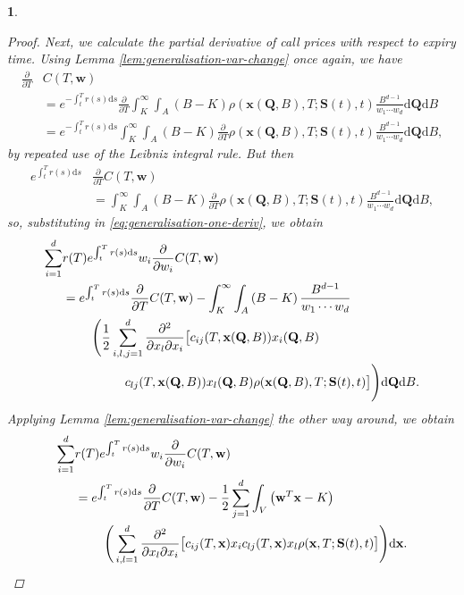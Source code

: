 \documentclass[english]{article}
\numberwithin{equation}{section}
\numberwithin{figure}{section}
\theoremstyle{bolddescit}
\newtheorem{theorem}{\protect\theoremname}[section]
\theoremstyle{definition}
\theoremstyle{definition}
\theoremstyle{plain}
\theoremstyle{plain}
\theoremstyle{bolddesc}
\theoremstyle{plain}
\theoremstyle{remark}
\providecommand{\theoremname}{Theorem}
\begin{document}
\begin{theorem}
\begin{proof}
    Next, we calculate the partial derivative of call prices with respect to expiry time. Using Lemma \ref{lem:generalisation-var-change} once again, we have
    \begin{align*}
      \frac{\partial}{\partial T} &C(T,\mathbf{w})\\
      &= e^{-\int_t^T r(s) \mathrm{d}s} \frac{\partial}{\partial T}\int_K^\infty \int_A \left(B - K\right) \rho(\mathbf{x}(\mathbf{Q},B),T;\mathbf{S}(t),t) \frac{B^{d-1}}{w_1 \cdots w_d} \mathrm{d}\mathbf{Q} \mathrm{d}B\\
      &= e^{-\int_t^T r(s) \mathrm{d}s} \int_K^\infty \int_A \left(B - K\right) \frac{\partial}{\partial T}\rho(\mathbf{x}(\mathbf{Q},B),T;\mathbf{S}(t),t) \frac{B^{d-1}}{w_1 \cdots w_d} \mathrm{d}\mathbf{Q} \mathrm{d}B,
    \end{align*}
    by repeated use of the Leibniz integral rule. But then
    \begin{align*}
      e^{\int_t^T r(s) \mathrm{d}s} &\frac{\partial}{\partial T} C(T,\mathbf{w})\\
      &= \int_K^\infty \int_A \left(B - K\right) \frac{\partial}{\partial T}\rho(\mathbf{x}(\mathbf{Q},B),T;\mathbf{S}(t),t) \frac{B^{d-1}}{w_1 \cdots w_d} \mathrm{d}\mathbf{Q} \mathrm{d}B,
    \end{align*}
    so, substituting in \eqref{eq:generalisation-one-deriv}, we obtain
    \begin{align*}
      \sum_{i=1}^{d} &r(T) e^{\int_t^T r(s) \mathrm{d}s} w_i \frac{\partial}{\partial w_i} C(T,\mathbf{w})\notag\\
      &= e^{\int_t^T r(s) \mathrm{d}s} \frac{\partial}{\partial T} C(T,\mathbf{w}) - \int_K^\infty \int_A \left(B - K\right) \frac{B^{d-1}}{w_1 \cdots w_d}\notag\\
        &\ \ \ \ \ \ \ \Bigg( \frac{1}{2} \sum_{i,l,j=1}^{d} \frac{\partial^2}{\partial x_l \partial x_i}\big[c_{ij}(T,\mathbf{x}(\mathbf{Q},B)) x_i(\mathbf{Q},B) \notag\\
        &\ \ \ \ \ \ \ \ \ \ \ \ \ \ \ c_{lj}(T,\mathbf{x}(\mathbf{Q},B)) x_l(\mathbf{Q},B) \rho(\mathbf{x}(\mathbf{Q},B),T;\mathbf{S}(t),t)\big] \Bigg) \mathrm{d}\mathbf{Q} \mathrm{d}B.
    \end{align*}
    Applying Lemma \ref{lem:generalisation-var-change} the other way around, we obtain
    \begin{align}
      \sum_{i=1}^{d} &r(T) e^{\int_t^T r(s) \mathrm{d}s} w_i \frac{\partial}{\partial w_i} C(T,\mathbf{w})\notag\\
      &= e^{\int_t^T r(s) \mathrm{d}s} \frac{\partial}{\partial T} C(T,\mathbf{w}) - \frac{1}{2} \sum_{j=1}^{d} \int_V \left(\mathbf{w}^T \mathbf{x} - K\right) \notag\\
        &\ \ \ \ \ \ \ \Bigg( \sum_{i,l=1}^{d} \frac{\partial^2}{\partial x_l \partial x_i}\big[c_{ij}(T,\mathbf{x}) x_i c_{lj}(T,\mathbf{x}) x_l \rho(\mathbf{x},T;\mathbf{S}(t),t)\big] \Bigg) \mathrm{d}\mathbf{x}. \label{eq:generalisation-two-derivs}
    \end{align}


\end{proof}
\end{theorem}
\end{document}
